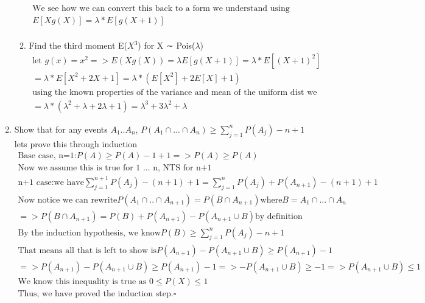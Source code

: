 \documentclass[11pt]{article}
\begin{document}
\begin{enumerate}
\begin{enumerate}
\begin{gather}
		\text{We see how we can convert this back to a form we understand using LOTUS}\\
		E[Xg(X)] = \lambda * E[g(X+1)] \\
	\end{gather}
	\item Find the third moment E($X^3$) for X ∼ Pois($\lambda$)
	\begin{gather}
		\text{let }g(x) = x^2
		=> E(Xg(X))=\lambda E[g(X+1)]=\lambda * E[(X+1)^2]\\
		= \lambda * E[X^2 + 2X+1] = \lambda * (E[X^2] + 2E[X] + 1) \\
		\text{using the known properties of the variance and mean of the uniform dist we get}\\
		= \lambda * (\lambda^2 + \lambda + 2\lambda + 1) = \lambda^3 + 3\lambda^2 + \lambda
	\end{gather}
\end{enumerate}
\item Show that for any events $A_1..A_n$,
$P(A_1\cap...\cap A_n) \geq \sum_{j=1}^{n} P(A_j) - n +1$\\
lets prove this through induction
\begin{gather} 
	\text{Base case, n=1:} P(A) \geq P(A) - 1 + 1 => P(A) \geq P(A)\\
	\text{Now we assume this is true for 1 ... n, NTS for n+1}\\
	\text{n+1 case:} \text{we have} \sum_{j=1}^{n+1} P(A_j) -(n+1) +1 = \sum_{j=1}^{n} P(A_j) + P(A_{n+1}) - (n+1) + 1\\
	\text{Now notice we can rewrite} P(A_1 \cap .. \cap A_{n+1}) = P(B\cap A_{n+1}) \text{where} B=A_1\cap ... \cap A_n\\
	=> P(B \cap A_{n+1}) = P(B) + P(A_{n+1}) - P(A_{n+1} \cup B) \text{by definition}\\
	\text{By the induction hypothesis, we know} P(B) \geq \sum_{j=1}^{n} P(A_j) - n + 1\\
	\text{That means all that is left to show is} P(A_{n+1}) - P(A_{n+1} \cup B) \geq  P(A_{n+1}) - 1\\
	=>P(A_{n+1}) - P(A_{n+1} \cup B) \geq  P(A_{n+1}) - 1 => -P(A_{n+1} \cup B) \geq - 1 => P(A_{n+1} \cup B) \leq 1 \\
	\text{We know this inequality is true as } 0 \leq P(X) \leq 1\\
	\text{Thus, we have proved the induction step}. \square
\end{gather}


\end{enumerate}
\end{document}

